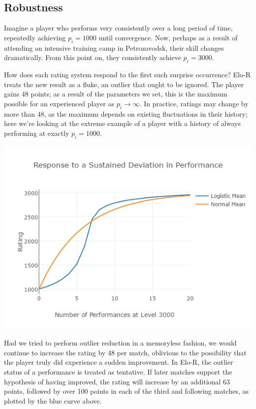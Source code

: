 \documentclass{article}
\begin{document}
\subsection{Robustness}

Imagine a player who performs very consistently over a long period of time, repeatedly achieving $p_i = 1000$ until convergence. Now, perhaps as a result of attending an intensive training camp in Petrozavodsk, their skill changes dramatically. From this point on, they consistently achieve $p_i = 3000$.

How does each rating system respond to the first such surprise occurrence? Elo-R treats the new result as a fluke, an outlier that ought to be ignored. The player gains 48 points; as a result of the parameters we set, this is the maximum possible for an experienced player as $p_i \rightarrow \infty$. In practice, ratings may change by more than 48, as the maximum depends on existing fluctuations in their history; here we're looking at the extreme example of a player with a history of always performing at exactly $p_i = 1000$.

\begin{center} \includegraphics[scale=0.5]{images/ResponsePlot.png} \end{center}

Had we tried to perform outlier reduction in a memoryless fashion, we would continue to increase the rating by 48 per match, oblivious to the possibility that the player truly did experience a sudden improvement. In Elo-R, the outlier status of a performance is treated as tentative. If later matches support the hypothesis of having improved, the rating will increase by an additional 63 points, followed by over 100 points in each of the third and following matches, as plotted by the blue curve above.
\end{document}
